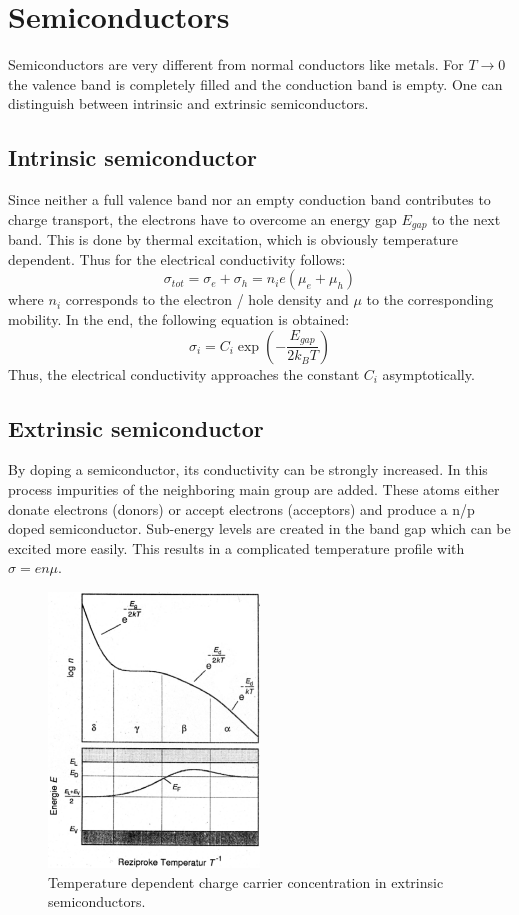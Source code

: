 \section{Semiconductors}
Semiconductors are very different from normal conductors like metals. For $T \rightarrow 0$ the valence band is completely filled and the conduction band is empty. One can distinguish between intrinsic and extrinsic semiconductors.


\subsection{Intrinsic semiconductor}


Since neither a full valence band nor an empty conduction band contributes to charge transport, the electrons have to overcome an energy gap $E_{gap}$ to the next band. This is done by thermal excitation, which is obviously temperature dependent. Thus for the electrical conductivity follows:
\begin{equation}
    \sigma_{tot} = \sigma_e+\sigma_h =n_ie(\mu_e+\mu_h)
\end{equation}
where $n_i$ corresponds to the electron / hole density and $\mu$ to the corresponding mobility. In the end, the following equation is obtained:
\begin{equation}
    \sigma_i = C_i \exp{\left (-\frac{E_{gap}}{2k_BT}\right)}
\end{equation}
Thus, the electrical conductivity approaches the constant $C_i$ asymptotically.


\subsection{Extrinsic semiconductor}
By doping a semiconductor, its conductivity can be strongly increased. In this process impurities of the neighboring main group are added. These atoms either donate electrons (donors) or accept electrons (acceptors) and produce a n/p doped semiconductor. Sub-energy levels are created in the band gap which can be excited more easily. This results in a complicated temperature profile with $\sigma = en\mu$.
\begin{figure}
    \centering
    \includegraphics[width=0.5\textwidth]{./fig/exhl.png}
    \caption{Temperature dependent charge carrier concentration in extrinsic semiconductors.}
    \label{fig:exhl}
\end{figure}


